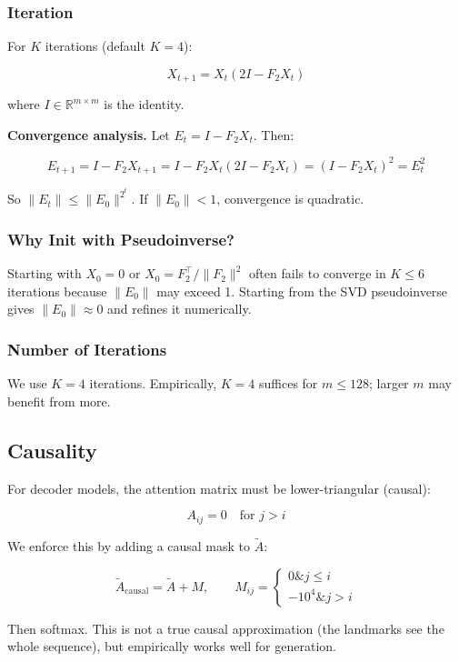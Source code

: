 \subsubsection{Iteration}

For $K$ iterations (default $K = 4$):

\[
X_{t+1} = X_t (2I - F_2 X_t)
\]

where $I \in \mathbb{R}^{m \times m}$ is the identity.

\textbf{Convergence analysis.} Let $E_t = I - F_2 X_t$. Then:

\[
E_{t+1} = I - F_2 X_{t+1} = I - F_2 X_t (2I - F_2 X_t) = (I - F_2 X_t)^2 = E_t^2
\]

So $\|E_t\| \le \|E_0\|^{2^t}$. If $\|E_0\| < 1$, convergence is quadratic.

\subsubsection{Why Init with Pseudoinverse?}

Starting with $X_0 = 0$ or $X_0 = F_2^\top / \|F_2\|^2$ often fails to 
converge in $K \le 6$ iterations because $\|E_0\|$ may exceed 1. Starting 
from the SVD pseudoinverse gives $\|E_0\| \approx 0$ and refines it 
numerically.

\subsubsection{Number of Iterations}

We use $K = 4$ iterations. Empirically, $K = 4$ suffices for 
$m \le 128$; larger $m$ may benefit from more.

\subsection{Causality}

For decoder models, the attention matrix must be lower-triangular (causal):

\[
A_{ij} = 0 \quad \text{for } j > i
\]

We enforce this by adding a causal mask to $\tilde{A}$:

\[
\tilde{A}_\text{causal} = \tilde{A} + M, \qquad
M_{ij} = \begin{cases} 0 \& j \le i \\ -10^4 \& j > i \end{cases}
\]

Then softmax. This is not a true causal approximation (the landmarks see 
the whole sequence), but empirically works well for generation.

